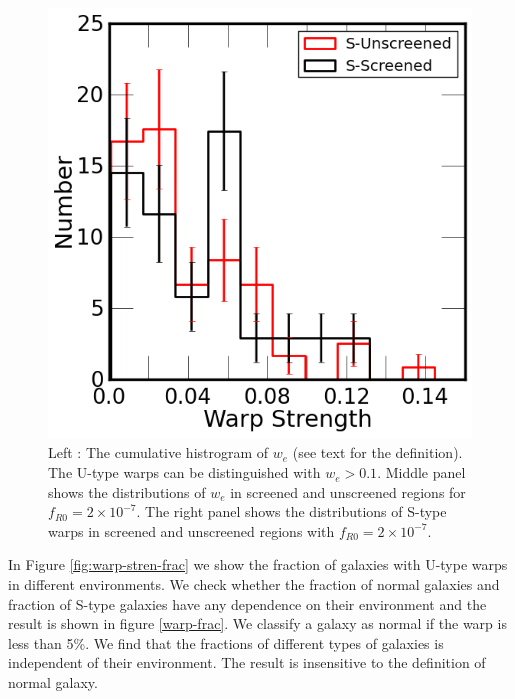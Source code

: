 \documentclass[useAMS,usenatbib,twocolumn]{mn2e}
\begin{document}
\begin{figure}
\begin{center}
\includegraphics[scale=0.35]{figures/warpness-S-distri.png}
\caption{Left : The cumulative histrogram of $w_e$ (see text for the
definition). The U-type warps can be distinguished  with $w_e > 0.1$. Middle
panel shows the distributions of $w_e$ in screened and unscreened regions for
$f_{R0}=2\times10^{-7}$. The right panel shows the distributions of S-type
warps in screened and unscreened regions with $f_{R0}=2\times10^{-7}$.}
\label{warp-cumu-1}
\end{center}
\end{figure}

In Figure \ref{fig:warp-stren-frac} we show the fraction of galaxies
with U-type warps in different environments. We check whether the fraction of
normal galaxies and fraction of S-type galaxies have any dependence on their
environment and the result is shown in figure \ref{warp-frac}. We classify
a galaxy as normal if the warp is less than 5\%.  We find that the
fractions of different types of galaxies is independent of their
environment. The result is insensitive to
the definition of normal galaxy.
\end{document}
